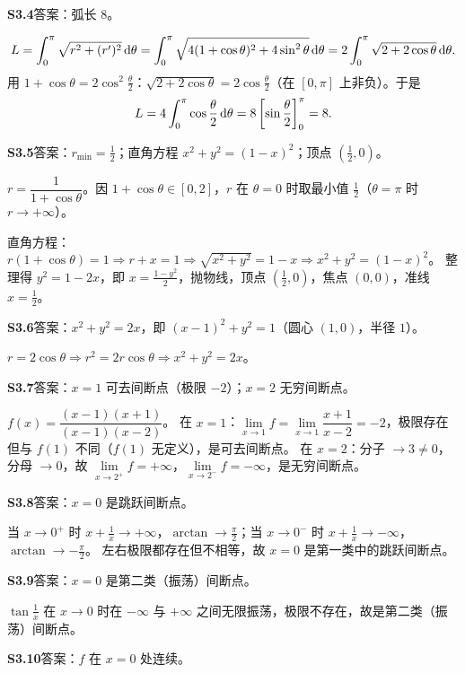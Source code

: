 \medskip
\noindent\textbf{S3.4}\quad 答案：弧长 $8$。

\[
L=\int_{0}^{\pi}\sqrt{r^{2}+(r')^{2}}\,\mathrm{d}\theta
=\int_{0}^{\pi}\sqrt{4(1+\cos\theta)^{2}+4\sin^{2}\theta}\,\mathrm{d}\theta
=2\int_{0}^{\pi}\sqrt{2+2\cos\theta}\,\mathrm{d}\theta.
\]
用 $1+\cos\theta=2\cos^{2}\frac\theta2$：$\sqrt{2+2\cos\theta}=2\cos\frac\theta2$（在 $[0,\pi]$ 上非负）。于是
\[
L=4\int_{0}^{\pi}\cos\frac\theta2\,\mathrm{d}\theta=8\left[\sin\frac\theta2\right]_{0}^{\pi}=8.
\]

\medskip
\noindent\textbf{S3.5}\quad 答案：$r_{\min}=\frac12$；直角方程 $x^{2}+y^{2}=(1-x)^{2}$；顶点 $\left(\frac12,0\right)$。

$r=\dfrac{1}{1+\cos\theta}$。因 $1+\cos\theta\in[0,2]$，$r$ 在 $\theta=0$ 时取最小值 $\frac12$（$\theta=\pi$ 时 $r\to+\infty$）。

直角方程：$r(1+\cos\theta)=1\Rightarrow r+x=1\Rightarrow \sqrt{x^{2}+y^{2}}=1-x\Rightarrow x^{2}+y^{2}=(1-x)^{2}$。
整理得 $y^{2}=1-2x$，即 $x=\frac{1-y^{2}}2$，抛物线，顶点 $\left(\frac12,0\right)$，焦点 $(0,0)$，准线 $x=\frac12$。

\medskip
\noindent\textbf{S3.6}\quad 答案：$x^{2}+y^{2}=2x$，即 $(x-1)^{2}+y^{2}=1$（圆心 $(1,0)$，半径 $1$）。

$r=2\cos\theta\Rightarrow r^{2}=2r\cos\theta\Rightarrow x^{2}+y^{2}=2x$。

\medskip
\noindent\textbf{S3.7}\quad 答案：$x=1$ 可去间断点（极限 $-2$）；$x=2$ 无穷间断点。

$f(x)=\dfrac{(x-1)(x+1)}{(x-1)(x-2)}$。
在 $x=1$：$\lim\limits_{x\to1}f=\lim\limits_{x\to1}\dfrac{x+1}{x-2}=-2$，极限存在但与 $f(1)$ 不同（$f(1)$ 无定义），是可去间断点。
在 $x=2$：分子 $\to3\neq0$，分母 $\to0$，故 $\lim\limits_{x\to2^{+}}f=+\infty$，$\lim\limits_{x\to2^{-}}f=-\infty$，是无穷间断点。

\medskip
\noindent\textbf{S3.8}\quad 答案：$x=0$ 是跳跃间断点。

当 $x\to0^{+}$ 时 $x+\frac1x\to+\infty$，$\arctan\to\frac\pi2$；当 $x\to0^{-}$ 时 $x+\frac1x\to-\infty$，$\arctan\to-\frac\pi2$。
左右极限都存在但不相等，故 $x=0$ 是第一类中的跳跃间断点。

\medskip
\noindent\textbf{S3.9}\quad 答案：$x=0$ 是第二类（振荡）间断点。

$\tan\frac1x$ 在 $x\to0$ 时在 $-\infty$ 与 $+\infty$ 之间无限振荡，极限不存在，故是第二类（振荡）间断点。

\medskip
\textbf{S3.10}\quad 答案：$f$ 在 $x=0$ 处连续。


